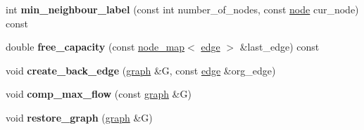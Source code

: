 \begin{DoxyCompactItemize}
\mbox{\label{classmaxflow__sap_a7cf86463129a569f41883fdad6869fce}} 
int {\bfseries min\+\_\+neighbour\+\_\+label} (const int number\+\_\+of\+\_\+nodes, const \mbox{\hyperlink{classnode}{node}} cur\+\_\+node) const
\item 
\mbox{\label{classmaxflow__sap_abd2935db387f32891228291a52d6ad45}} 
double {\bfseries free\+\_\+capacity} (const \mbox{\hyperlink{classnode__map}{node\+\_\+map}}$<$ \mbox{\hyperlink{classedge}{edge}} $>$ \&last\+\_\+edge) const
\item 
\mbox{\label{classmaxflow__sap_a4278d120bdbc505abb176f5ca6ba02b3}} 
void {\bfseries create\+\_\+back\+\_\+edge} (\mbox{\hyperlink{classgraph}{graph}} \&G, const \mbox{\hyperlink{classedge}{edge}} \&org\+\_\+edge)
\item 
\mbox{\label{classmaxflow__sap_ae5ff08e7b1c5fe5845a2ed584b04ca1b}} 
void {\bfseries comp\+\_\+max\+\_\+flow} (const \mbox{\hyperlink{classgraph}{graph}} \&G)
\item 
\mbox{\label{classmaxflow__sap_ad1a311df47e4b9936ead7c306d723ed0}} 
void {\bfseries restore\+\_\+graph} (\mbox{\hyperlink{classgraph}{graph}} \&G)
\end{DoxyCompactItemize}
